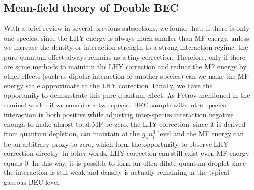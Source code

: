 \subsection{Mean-field theory of Double BEC}

With a brief review in several previous subsections, we found that: if there is only one species, since the LHY energy is always much smaller than MF energy, unless we increase the density or interaction strength to a strong interaction regime, the pure quantum effect always remains as a tiny correction. Therefore, only if there are some methods to maintain the LHY correction and reduce the MF energy by other effects (such as dipolar interaction or another species) can we make the MF energy scale approximate to the LHY correction. Finally, we have the opportunity to demonstrate this pure quantum effect. As Petrov mentioned in the seminal work \cite{petrov2015}: if we consider a two-species BEC sample with intra-species interaction in both positive while adjusting inter-species interaction negative enough to make almost total MF be zero, the LHY correction, since it is derived from quantum depletion, can maintain at the $g_{ii} n_i^3$ level and the MF energy can be an arbitrary proxy to zero, which form the opportunity to observe LHY correction directly. In other words, LHY correction can still exist even MF energy equals 0. In this way, it is possible to form an ultra-dilute quantum droplet since the interaction is still weak and density is actually remaining in the typical gaseous BEC level.

